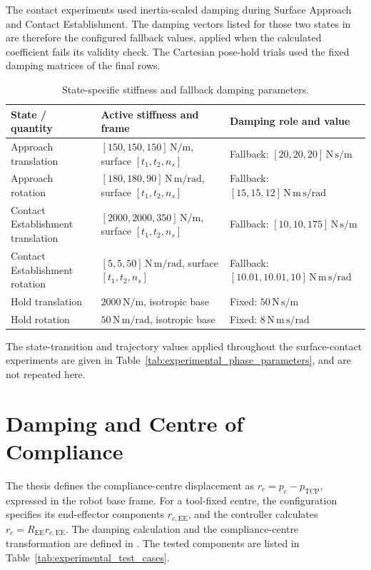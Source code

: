 The contact experiments used inertia-scaled damping during Surface Approach and
Contact Establishment. The damping vectors listed for those two states in
\mbox{} are therefore the configured fallback
values, applied when the calculated coefficient fails its validity check. The
Cartesian pose-hold trials used the fixed damping matrices of the final rows.

\begin{table}[H]
\centering
\caption{State-specific stiffness and fallback damping parameters.}
\label{tab:active_phase_gains}
\small
\begin{tabular}{@{}
>{\raggedright\arraybackslash}p{}
>{\raggedright\arraybackslash}p{}
>{\raggedright\arraybackslash}p{}@{}}
\toprule
State / quantity & Active stiffness and frame & Damping role and value \\
\midrule
Approach translation &
  \([150,150,150]\,\mathrm{N/m}\), surface \([t_1,t_2,n_s]\) &
  Fallback: \([20,20,20]\,\mathrm{N\,s/m}\) \\
Approach rotation &
  \([180,180,90]\,\mathrm{N\,m/rad}\), surface \([t_1,t_2,n_s]\) &
  Fallback: \([15,15,12]\,\mathrm{N\,m\,s/rad}\) \\
Contact Establishment translation &
  \([2000,2000,350]\,\mathrm{N/m}\), surface \([t_1,t_2,n_s]\) &
  Fallback: \([10,10,175]\,\mathrm{N\,s/m}\) \\
Contact Establishment rotation &
  \([5,5,50]\,\mathrm{N\,m/rad}\), surface \([t_1,t_2,n_s]\) &
  Fallback: \([10.01,10.01,10]\,\mathrm{N\,m\,s/rad}\) \\
Hold translation &
  \(2000\,\mathrm{N/m}\), isotropic base &
  Fixed: \(50\,\mathrm{N\,s/m}\) \\
Hold rotation &
  \(50\,\mathrm{N\,m/rad}\), isotropic base &
  Fixed: \(8\,\mathrm{N\,m\,s/rad}\) \\
\bottomrule
\end{tabular}
\end{table}

The state-transition and trajectory values applied throughout the
surface-contact experiments are given in
Table~\ref{tab:experimental_phase_parameters}, and are not repeated here.

\section{Damping and Centre of Compliance}

The thesis defines the compliance-centre displacement as
\mbox{\(r_c=p_c-p_{\mathrm{TCP}}\)}, expressed in the robot base frame. For
a tool-fixed centre, the configuration specifies its end-effector components
\mbox{\(r_{c,\mathrm{EE}}\)}, and the controller calculates
\mbox{\(r_c=R_{\mathrm{EE}}r_{c,\mathrm{EE}}\)}. The damping calculation
and the compliance-centre transformation are defined in
\mbox{}.
The tested components are listed in
\mbox{Table~\ref{tab:experimental_test_cases}}.


